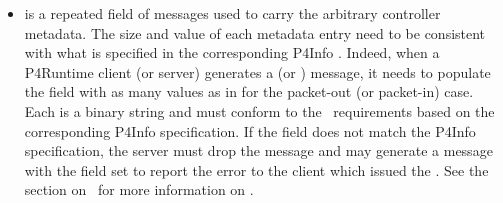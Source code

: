 \documentclass[11pt]{article}
\begin{document}
{\begin{itemize}
\item{}
 is a repeated field of  messages used to carry the
arbitrary controller metadata. The size and value of each metadata entry need
to be consistent with what is specified in the corresponding P4Info
. Indeed, when a P4Runtime client (or server)
generates a  (or ) message, it needs to populate the
 field with as many values as in 
for the packet-out (or packet-in) case. Each  is a
binary string and must conform to the~
requirements based on the corresponding P4Info
 specification. If the  field
does not match the P4Info specification, the server must drop the 
message and may generate a  message with the 
field set to report the error to the client which issued the . See
the section on~ for more
information on .%
\end{itemize}%

}
\end{document}
